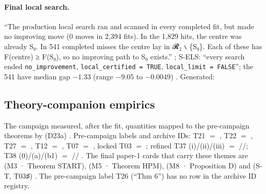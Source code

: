 \paragraph{Final local search.}  ``The production local search ran and scanned in every completed fit, but made no improving
move (0 moves in 2,394 fits). In the 1,829 hits, the centre was already S₀. In 541 completed misses the centre lay in 𝓡₂ ∖ \{S₀\}. Each
of these has F(centre) ≥ F(S₀), so no improving path to S₀ exists.'' ;
S-ELS: ``every search ended \texttt{no\_improvement}, \texttt{local\_certified = TRUE}, \texttt{local\_limit = FALSE}''; the 541 have
median gap $-1.33$ (range $-9.05$ to $-0.0049$) . Generated:


\subsection{Theory-companion empirics}\label{sec:emp-theory}

The campaign measured, after the fit, quantities mapped to the pre-campaign theorems by
 (D23a) . Pre-campaign labels and archive IDs: T21 $=$
, T22 $=$ , T27 $=$ , T12 $=$ , T07 $=$ , locked T03 $=$ ; refined T37
(i)/(ii)/(iii) $=$ //; T38 (0)/(a)/(b1) $=$ //
  . The final paper-1 cards that
carry these themes are  (M3 · Theorem START),  (M5 · Theorem HPM),  (M8 · Proposition D) and 
(S-T, T03♯) \approvedFB. The pre-campaign label T26 (``Thm 6'') has no row in the archive ID registry.

